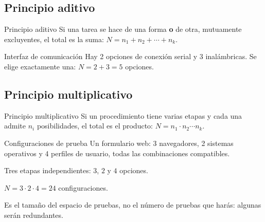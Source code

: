 
\subsection{Principio aditivo}
\begin{tmdef}{Principio aditivo}
Si una tarea se hace de una forma \textbf{o} de otra, mutuamente excluyentes, el total es la suma: $N=n_1+n_2+\cdots+n_k$.
\end{tmdef}

\begin{tmejemplo}{Interfaz de comunicaci\'on}
Hay 2 opciones de conexi\'on serial y 3 inal\'ambricas. Se elige exactamente una: $N=2+3=5$ opciones.
\end{tmejemplo}

\subsection{Principio multiplicativo}
\begin{tmdef}{Principio multiplicativo}
Si un procedimiento tiene varias etapas y cada una admite $n_i$ posibilidades, el total es el producto: $N=n_1\cdot n_2\cdots n_k$.
\end{tmdef}

\begin{center}
\end{center}

\begin{tmejemplo}{Configuraciones de prueba}
Un formulario web: 3 navegadores, 2 sistemas operativos y 4 perfiles de usuario, todas las combinaciones compatibles.
\begin{tmpasos}
\item Tres etapas independientes: $3$, $2$ y $4$ opciones.
\item $N=3\cdot2\cdot4=24$ configuraciones.
\item Es el tama\~no del espacio de pruebas, no el n\'umero de pruebas que har\'as: algunas ser\'an redundantes.
\end{tmpasos}
\end{tmejemplo}

